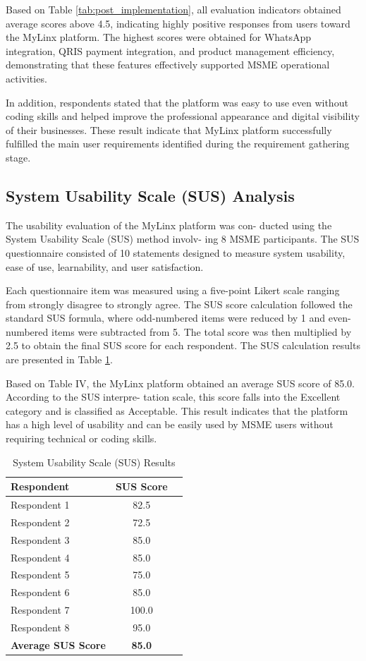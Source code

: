 \documentclass[conference]{IEEEtran}
\begin{document}
Based on Table \ref{tab:post_implementation}, all evaluation indicators obtained average scores above 4.5, indicating highly positive responses from users toward the MyLinx platform. The highest scores were obtained for WhatsApp integration, QRIS payment integration, and product management efficiency, demonstrating that these features effectively supported MSME operational activities.

In addition, respondents stated that the platform was easy to use even without coding skills and helped improve the professional appearance and digital visibility of their businesses. These result indicate that MyLinx platform successfully fulfilled the main user requirements identified during the requirement gathering stage.

\subsection{System Usability Scale (SUS) Analysis}

The usability evaluation of the MyLinx platform was con- ducted using the System Usability Scale (SUS) method involv- ing 8 MSME participants. The SUS questionnaire consisted of 10 statements designed to measure system usability, ease of use, learnability, and user satisfaction.

Each questionnaire item was measured using a five-point Likert scale ranging from strongly disagree to strongly agree. The SUS score calculation followed the standard SUS formula, where odd-numbered items were reduced by 1 and even- numbered items were subtracted from 5. The total score was then multiplied by 2.5 to obtain the final SUS score for each respondent. The SUS calculation results are presented in Table \ref{tab:sus_result}.

Based on Table IV, the MyLinx platform obtained an average SUS score of 85.0. According to the SUS interpre- tation scale, this score falls into the Excellent category and is classified as Acceptable. This result indicates that the platform has a high level of usability and can be easily used by MSME users without requiring technical or coding skills.
\begin{table}[H]
\centering
\small
\caption{System Usability Scale (SUS) Results}
\begin{tabular}{p{4.5cm}cc}
\hline
\textbf{Respondent} & \textbf{SUS Score} \\
\hline
Respondent 1 & 82.5 \\
Respondent 2 & 72.5 \\
Respondent 3 & 85.0 \\
Respondent 4 & 85.0 \\
Respondent 5 & 75.0 \\
Respondent 6 & 85.0 \\
Respondent 7 & 100.0 \\
Respondent 8 & 95.0 \\
\hline
\textbf{Average SUS Score} & \textbf{85.0} \\
\hline
\end{tabular}
\label{tab:sus_result}
\end{table}
\end{document}
